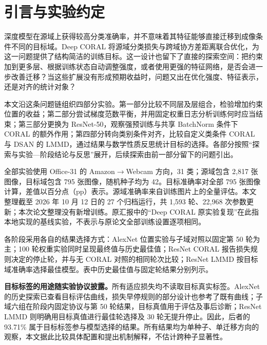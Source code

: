 \section*{引言与实验约定}

深度模型在源域上获得较高分类准确率，并不意味着其特征能够直接迁移到成像条件不同的目标域。Deep CORAL 将源域分类损失与跨域协方差距离联合优化，为这一问题提供了结构简洁的训练目标\cite{sun2016deep}。这一设计也留下了直接的探索空间：把约束加到更多层、根据训练状态自动调整强度，或者使用更强的特征网络，是否会进一步改善迁移？当这些扩展没有形成预期收益时，问题又出在优化强度、特征表示，还是对齐的统计对象？

本文沿这条问题链组织四部分实验。第一部分比较不同层及层组合，检验增加约束位置的收益；第二部分尝试梯度范数平衡，并用固定权重日志分析训练何时应当结束；第三部分更换为 ResNet-50，观察强预训练与共享 BatchNorm 条件下 CORAL 的额外作用；第四部分转向类别条件对齐，比较自定义类条件 CORAL 与 DSAN 的 LMMD\cite{zhu2021dsan}，通过结果与数学性质反思统计目标的选择。各部分按照“探索与实验—阶段结论与反思”展开，后续探索由前一部分留下的问题引出。

全部实验使用 Office-31 的 Amazon$\to$Webcam 方向，31 类；源域包含 2,817 张图像，目标域包含 795 张图像，随机种子均为 42。目标准确率对全部 795 张图像计算，差值以百分点（pp）表示。源域准确率来自训练图片上的全量评估。本文整理截至 2026 年 10 月 12 日的 27 个归档运行，共 1,593 轮、22,968 次参数更新；本次论文整理没有新增训练。原汇报中的“Deep CORAL 原实验复现”在此指本地实现的基线实验，不表示与原论文全部训练设置逐项相同。

各阶段采用各自的结果选择方式：AlexNet 位置实验与子域对照以固定第 50 轮为主；100 轮权重实验同时呈现最终值与历史最佳值；ResNet CORAL 报告损失规则决定的停止轮，并与无 CORAL 对照的相同轮次比较；ResNet LMMD 按目标域准确率选择最佳模型。表中历史最佳值与固定轮结果分别列示。

\textbf{目标标签的用途随实验协议披露。}所有适应损失均不读取目标真实标签。AlexNet 的历史探索已查看目标评估曲线，损失早停规则的部分设计也参考了既有曲线；子域六组在阶段内固定协议与第 50 轮结果，目标真值用于评估及事后诊断；ResNet LMMD 则明确用目标真值进行最佳轮选择及 30 轮无提升停止。因此，后者的 93.71\% 属于目标标签参与模型选择的结果。所有结果均为单种子、单迁移方向的观察，本文据此比较具体配置和提出机制解释，不估计跨种子显著性。
